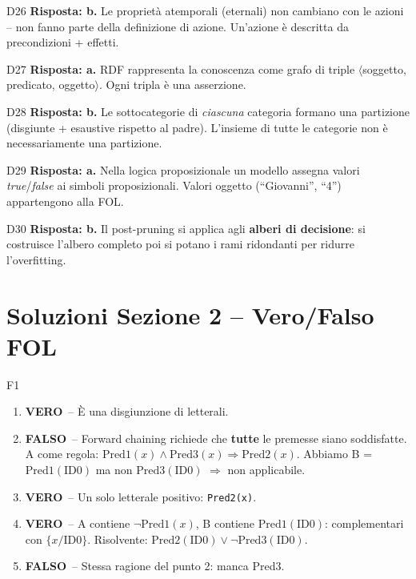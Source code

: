 \documentclass[12pt,a4paper]{article}
\newcommand{\V}{\textcolor{green!60!black}{\textbf{VERO}}}
\newcommand{\F}{\textcolor{red!70!black}{\textbf{FALSO}}}
\begin{document}
\begin{risposta}{D26}
\textbf{Risposta: b.} Le proprietà atemporali (eternali) non cambiano con le azioni -- non fanno parte della definizione di azione. Un'azione è descritta da precondizioni + effetti.
\end{risposta}

\begin{risposta}{D27}
\textbf{Risposta: a.} RDF rappresenta la conoscenza come grafo di triple $\langle$soggetto, predicato, oggetto$\rangle$. Ogni tripla è una asserzione.
\end{risposta}

\begin{risposta}{D28}
\textbf{Risposta: b.} Le sottocategorie di \emph{ciascuna} categoria formano una partizione (disgiunte + esaustive rispetto al padre). L'insieme di tutte le categorie non è necessariamente una partizione.
\end{risposta}

\begin{risposta}{D29}
\textbf{Risposta: a.} Nella logica proposizionale un modello assegna valori \textit{true}/\textit{false} ai simboli proposizionali. Valori oggetto (``Giovanni'', ``4'') appartengono alla FOL.
\end{risposta}

\begin{risposta}{D30}
\textbf{Risposta: b.} Il post-pruning si applica agli \textbf{alberi di decisione}: si costruisce l'albero completo poi si potano i rami ridondanti per ridurre l'overfitting.
\end{risposta}

\section*{Soluzioni Sezione 2 -- Vero/Falso FOL}

\begin{risposta}{F1}
\begin{enumerate}[noitemsep, label=\arabic*.]
  \item \V\ -- È una disgiunzione di letterali.
  \item \F\ -- Forward chaining richiede che \textbf{tutte} le premesse siano soddisfatte. A come regola: $\text{Pred1}(x) \land \text{Pred3}(x) \Rightarrow \text{Pred2}(x)$. Abbiamo B = $\text{Pred1}(\text{ID0})$ ma non $\text{Pred3}(\text{ID0})$ $\Rightarrow$ non applicabile.
  \item \V\ -- Un solo letterale positivo: \texttt{Pred2(x)}.
  \item \V\ -- A contiene $\neg\text{Pred1}(x)$, B contiene $\text{Pred1}(\text{ID0})$: complementari con $\{x/\text{ID0}\}$. Risolvente: $\text{Pred2}(\text{ID0}) \lor \neg\text{Pred3}(\text{ID0})$.
  \item \F\ -- Stessa ragione del punto 2: manca Pred3.
\end{enumerate}
\end{risposta}
\end{document}
